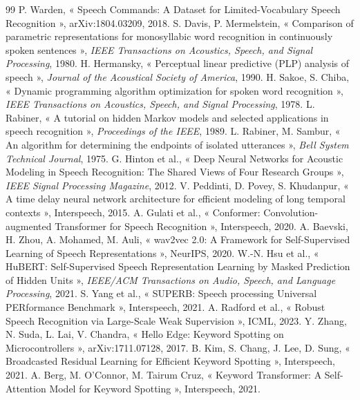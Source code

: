 \documentclass[11pt,a4paper]{article}
\begin{document}
\begin{thebibliography}{99}\small
{} P. Warden, « Speech Commands: A Dataset for Limited-Vocabulary Speech Recognition », arXiv:1804.03209, 2018.
 S. Davis, P. Mermelstein, « Comparison of parametric representations for monosyllabic word recognition in continuously spoken sentences », \emph{IEEE Transactions on Acoustics, Speech, and Signal Processing}, 1980.
 H. Hermansky, « Perceptual linear predictive (PLP) analysis of speech », \emph{Journal of the Acoustical Society of America}, 1990.
 H. Sakoe, S. Chiba, « Dynamic programming algorithm optimization for spoken word recognition », \emph{IEEE Transactions on Acoustics, Speech, and Signal Processing}, 1978.
 L. Rabiner, « A tutorial on hidden Markov models and selected applications in speech recognition », \emph{Proceedings of the IEEE}, 1989.
 L. Rabiner, M. Sambur, « An algorithm for determining the endpoints of isolated utterances », \emph{Bell System Technical Journal}, 1975.
 G. Hinton et al., « Deep Neural Networks for Acoustic Modeling in Speech Recognition: The Shared Views of Four Research Groups », \emph{IEEE Signal Processing Magazine}, 2012.
 V. Peddinti, D. Povey, S. Khudanpur, « A time delay neural network architecture for efficient modeling of long temporal contexts », Interspeech, 2015.
 A. Gulati et al., « Conformer: Convolution-augmented Transformer for Speech Recognition », Interspeech, 2020.
 A. Baevski, H. Zhou, A. Mohamed, M. Auli, « wav2vec 2.0: A Framework for Self-Supervised Learning of Speech Representations », NeurIPS, 2020.
 W.-N. Hsu et al., « HuBERT: Self-Supervised Speech Representation Learning by Masked Prediction of Hidden Units », \emph{IEEE/ACM Transactions on Audio, Speech, and Language Processing}, 2021.
 S. Yang et al., « SUPERB: Speech processing Universal PERformance Benchmark », Interspeech, 2021.
 A. Radford et al., « Robust Speech Recognition via Large-Scale Weak Supervision », ICML, 2023.
 Y. Zhang, N. Suda, L. Lai, V. Chandra, « Hello Edge: Keyword Spotting on Microcontrollers », arXiv:1711.07128, 2017.
 B. Kim, S. Chang, J. Lee, D. Sung, « Broadcasted Residual Learning for Efficient Keyword Spotting », Interspeech, 2021.
 A. Berg, M. O'Connor, M. Tairum Cruz, « Keyword Transformer: A Self-Attention Model for Keyword Spotting », Interspeech, 2021.
\end{thebibliography}
\end{document}
